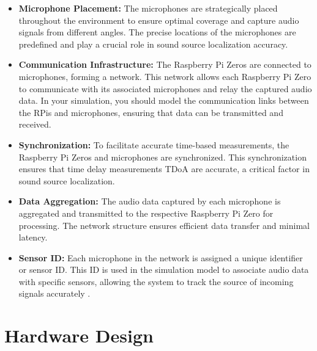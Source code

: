 \documentclass[a4paper,11pt]{article}
\newcommand{\mysection}[2]{\setcounter{section}{#1}\addtocounter{section}{-1}\section{#2}}
\begin{document}
\begin{itemize}
	\item
	\textbf{Microphone Placement:} The microphones are strategically placed throughout the environment to ensure optimal coverage and capture audio signals from different angles. The precise locations of the microphones are predefined and play a crucial role in sound source localization accuracy. 
	\item 
	\textbf{Communication Infrastructure:} The Raspberry Pi Zeros are connected to microphones, forming a network. This network allows each Raspberry Pi Zero to communicate with its associated microphones and relay the captured audio data. In your simulation, you should model the communication links between the RPis and microphones, ensuring that data can be transmitted and received. 
	\item 
	\textbf{Synchronization:} To facilitate accurate time-based measurements, the Raspberry Pi Zeros and microphones are synchronized. This synchronization ensures that time delay measurements TDoA are accurate, a critical factor in sound source localization. 
	\item 
	\textbf{Data Aggregation:} The audio data captured by each microphone is aggregated and transmitted to the respective Raspberry Pi Zero for processing. The network structure ensures efficient data transfer and minimal latency. 
	\item 	
	\textbf{Sensor ID:} Each microphone in the network is assigned a unique identifier or sensor ID. This ID is used in the simulation model to associate audio data with specific sensors, allowing the system to track the source of incoming signals accurately .
	
\end{itemize}

\mysection{3}{Hardware Design}
\end{document}
